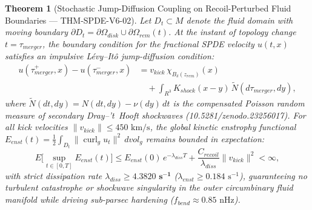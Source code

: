\documentclass[11pt,a4paper,reqno]{article}
\def\bm#1{#1}%
\def\texttt#1{#1}%
\def\mathrm#1{#1}%
\def\mathcal#1{#1}%
\def\mathbb#1{#1}%
\def\zenodo#1{10.5281/zenodo.#1}%
\newcommand{\zenodo}[1]{\href{https://doi.org/10.5281/zenodo.#1}{\texttt{10.5281/\allowbreak zenodo.#1}}}
\theoremstyle{plain}
\newtheorem{theorem}{Theorem}[section]
\theoremstyle{definition}
\theoremstyle{remark}
\numberwithin{equation}{section}
\begin{document}
\begin{theorem}[{Stochastic Jump-Diffusion Coupling on Recoil-Perturbed Fluid Boundaries --- \texttt{THM-SPDE-V6-02}}]\label{thm:spde_v6_recoil}
Let $\mathcal{D}_t \subset \mathcal{M}$ denote the fluid domain with moving boundary $\partial\mathcal{D}_t = \partial\Omega_{\mathrm{disk}} \cup \partial\Omega_{\mathrm{rem}}(t)$. At the instant of topology change $t = \tau_{\mathrm{merger}}$, the boundary condition for the fractional SPDE velocity $\bm{u}(t, \bm{x})$ satisfies an impulsive L\'evy--It\^o jump-diffusion condition:
\begin{equation}
\begin{aligned}
\bm{u}(\tau_{\mathrm{merger}}^+, \bm{x}) - \bm{u}(\tau_{\mathrm{merger}}^-, \bm{x}) &= \bm{v}_{\mathrm{kick}}\,\chi_{\mathcal{B}_{\delta}(\bm{z}_{\mathrm{rem}})}(\bm{x}) \\
&\quad + \int_{\mathbb{R}^3} \bm{\mathcal{K}}_{\mathrm{shock}}(\bm{x} - \bm{y})\, \tilde{N}(\mathrm{d}\tau_{\mathrm{merger}}, \mathrm{d}\bm{y}),
\end{aligned}
\end{equation}
where $\tilde{N}(\mathrm{d}t, \mathrm{d}\bm{y}) = N(\mathrm{d}t, \mathrm{d}\bm{y}) - \nu(\mathrm{d}\bm{y})\,\mathrm{d}t$ is the compensated Poisson random measure of secondary Dray--'t~Hooft shockwaves (\zenodo{23256017}). For all kick velocities $\lVert \bm{v}_{\mathrm{kick}} \rVert \le 450\text{ km/s}$, the global kinetic enstrophy functional $\mathcal{E}_{\mathrm{enst}}(t) = \frac{1}{2}\int_{\mathcal{D}_t} \lVert \operatorname{curl}_g \bm{u}_t \rVert^2\,\mathrm{d}\mathrm{vol}_g$ remains bounded in expectation:
\begin{equation}
\mathbb{E}\Big[\sup_{t \in [0, T]} \mathcal{E}_{\mathrm{enst}}(t)\Big] \le \mathcal{E}_{\mathrm{enst}}(0)\,\mathrm{e}^{-\lambda_{\mathrm{diss}} T} + \frac{C_{\mathrm{recoil}}}{\lambda_{\mathrm{diss}}}\lVert \bm{v}_{\mathrm{kick}} \rVert^2 < \infty,
\end{equation}
with strict dissipation rate $\lambda_{\mathrm{diss}} \ge \mathbf{4.3820\text{ s}^{-1}}$ ($\lambda_{\mathrm{enst}} \ge 0.184\text{ s}^{-1}$), guaranteeing no turbulent catastrophe or shockwave singularity in the outer circumbinary fluid manifold while driving sub-parsec hardening ($f_{\mathrm{bend}} \approx 0.85\text{ nHz}$).
\end{theorem}

\end{document}
